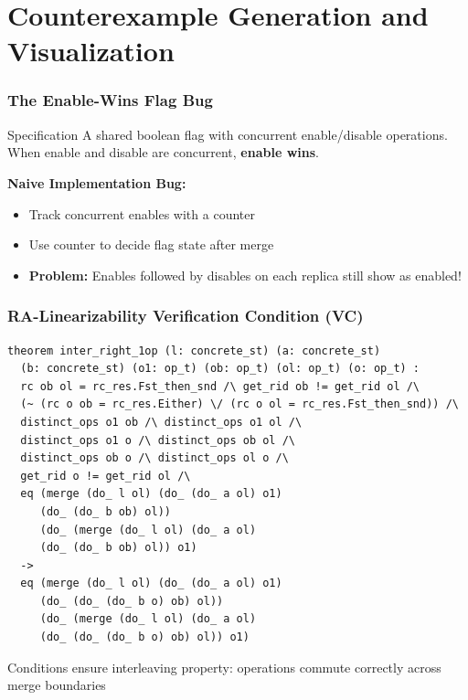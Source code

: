 \documentclass[usepdftitle=false]{beamer}
\begin{document}
\section{Counterexample Generation and Visualization}

\begin{frame}
  \frametitle{The Enable-Wins Flag Bug}
  
  \begin{block}{Specification}
    A shared boolean flag with concurrent enable/disable operations.
    When enable and disable are concurrent, \textbf{enable wins}.
  \end{block}
  
  \vspace{0.3cm}
  \textbf{Naive Implementation Bug:}
  \begin{itemize}[<+->]
    \item Track concurrent enables with a counter
    \item Use counter to decide flag state after merge
    \item \textbf{Problem:} Enables followed by disables on each replica still show as enabled!
  \end{itemize}
\end{frame}

\begin{frame}[fragile]
  \frametitle{RA-Linearizability Verification Condition (VC)}
  
  \small
  \begin{lstlisting}[style=leanstyle, basicstyle=\tiny\ttfamily, breaklines=true]
theorem inter_right_1op (l: concrete_st) (a: concrete_st) 
  (b: concrete_st) (o1: op_t) (ob: op_t) (ol: op_t) (o: op_t) :
  rc ob ol = rc_res.Fst_then_snd /\ get_rid ob != get_rid ol /\
  (~ (rc o ob = rc_res.Either) \/ (rc o ol = rc_res.Fst_then_snd)) /\
  distinct_ops o1 ob /\ distinct_ops o1 ol /\ 
  distinct_ops o1 o /\ distinct_ops ob ol /\ 
  distinct_ops ob o /\ distinct_ops ol o /\
  get_rid o != get_rid ol /\
  eq (merge (do_ l ol) (do_ (do_ a ol) o1) 
     (do_ (do_ b ob) ol))
     (do_ (merge (do_ l ol) (do_ a ol) 
     (do_ (do_ b ob) ol)) o1)
  ->
  eq (merge (do_ l ol) (do_ (do_ a ol) o1) 
     (do_ (do_ (do_ b o) ob) ol))
     (do_ (merge (do_ l ol) (do_ a ol) 
     (do_ (do_ (do_ b o) ob) ol)) o1)
  \end{lstlisting}
  
  \vspace{0.2cm}
  \small Conditions ensure interleaving property: operations commute correctly across merge boundaries
\end{frame}
\end{document}
